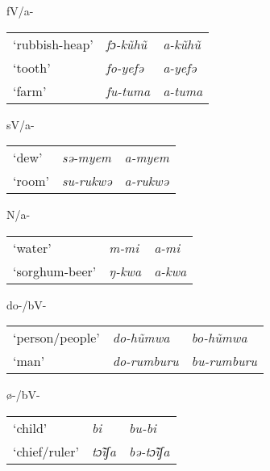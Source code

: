 \documentclass[output=paper]{langsci/langscibook}
\begin{document}
\begin{exe}
\exi{}
\begin{xlist}
\setcounter{xnumii}{3}

\ex fV/a-

\begin{tabularx}{.8\textwidth}{XXX}
‘rubbish-heap’	&  \textit{fɔ-kũhũ}	&  \textit{a-kũhũ}\\
‘tooth’	&  \textit{fo-yefə}	&  \textit{a-yefə}\\
‘farm’	&  \textit{fu-tuma}	&  \textit{a-tuma}\\
\end{tabularx}
\ex  sV/a-

\begin{tabularx}{.8\textwidth}{XXX}
‘dew’	&  \textit{sə-myem}	&  \textit{a-myem}\\
‘room’	&  \textit{su-rukwə}	&  \textit{a-rukwə}\\
\end{tabularx}
\ex   N/a-

\begin{tabularx}{.8\textwidth}{XXX}
‘water’	&  \textit{m-mi}	&  \textit{a-mi}\\
‘sorghum-beer’	&  \textit{ŋ-kwa}	&  \textit{a-kwa}\\
\end{tabularx}
\ex   do-/bV-

\begin{tabularx}{.8\textwidth}{XXX}
‘person/people’	&  \textit{do-hũmwa}	&  \textit{bo-hũmwa}\\
‘man’	&  \textit{do-rumburu}	&  \textit{bu-rumburu}\\
\end{tabularx}
\ex   ø-/bV-

\begin{tabularx}{.8\textwidth}{XXX}
‘child’	&  \textit{bi}	&  \textit{bu-bi}\\
‘chief/ruler’	&  \textit{tɔ̃ĩʃa}	&  \textit{bə-tɔ̃ĩʃa}\\
\end{tabularx} 

\end{xlist}
\end{exe}
\end{document}
